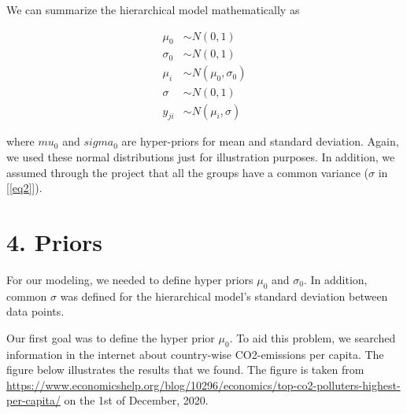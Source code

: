 \documentclass[
]{article}
\begin{document}
We can summarize the hierarchical model mathematically as

\begin{align}\label{eq2}
     \mu_0 & \sim N(0,1) \\
     \sigma_0 & \sim N(0,1) \\
     \mu_i & \sim N(\mu_0, \sigma_0) \\
     \sigma & \sim N(0,1) \\
     y_{ji} & \sim N(\mu_i,\sigma)
\end{align}

where \(mu_0\) and \(sigma_0\) are hyper-priors for mean and standard
deviation. Again, we used these normal distributions just for
illustration purposes. In addition, we assumed through the project that
all the groups have a common variance (\(\sigma\) in {[}\ref{eq2}{]}).

\hypertarget{priors}{%
\section{4. Priors}\label{priors}}

For our modeling, we needed to define hyper priors \(\mu_0\) and
\(\sigma_0\). In addition, common \(\sigma\) was defined for the
hierarchical model's standard deviation between data points.

Our first goal was to define the hyper prior \(\mu_0\). To aid this
problem, we searched information in the internet about country-wise
CO2-emissions per capita. The figure below illustrates the results that
we found. The figure is taken from
\url{https://www.economicshelp.org/blog/10296/economics/top-co2-polluters-highest-per-capita/}
on the 1st of December, 2020.
\end{document}
